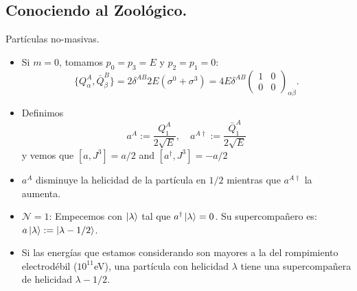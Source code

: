 \documentclass[10pt,a4paper]{beamer}
\begin{document}
\subsection{Conociendo al Zoológico.}
\begin{frame}{Partículas no-masivas.}
\begin{itemize}
  \item Si $m=0$, tomamos $p_0 = p_3 = E$ y $p_2 = p_1 = 0$:
\[\{Q^A_\alpha, \bar Q^B_{\dot\beta} \}
  =
  2 \delta^{AB}2E(\sigma^0+\sigma^3)=4 E\delta^{AB}
  \begin{pmatrix}
    1&0\\
    0&0
  \end{pmatrix}_{\alpha\dot\beta}.
\]

\item Definimos
\[
a^A:= \frac{Q_1^A}{2\sqrt{E}},\quad
  a^{A\dag}:= \frac{\bar Q_{\dot1}^A}{2\sqrt{E}}
\]
y vemos que
$\left[a,J^3\right] = a/2$ and $\left[a^\dag,J^3\right] = -a/2$ 
\item $a^A$ disminuye la helicidad de la partícula en $1/2$ mientras que
$a^{A\dag}$ la aumenta.

\item $\mathcal N =1$: Empecemos con $\ket{\lambda}$ tal que
$a^\dag\ket{\lambda} = 0$. Su supercompañero es:
$a\ket{\lambda}:=\ket{\lambda-1/2}$. 

\item Si las energías que estamos considerando son mayores a la del rompimiento
  electrodébil ($10^{11}$eV), una partícula con helicidad $\lambda$ tiene una
  supercompañera de helicidad $\lambda -1/2$.
\end{itemize}
\end{frame}
\end{document}
